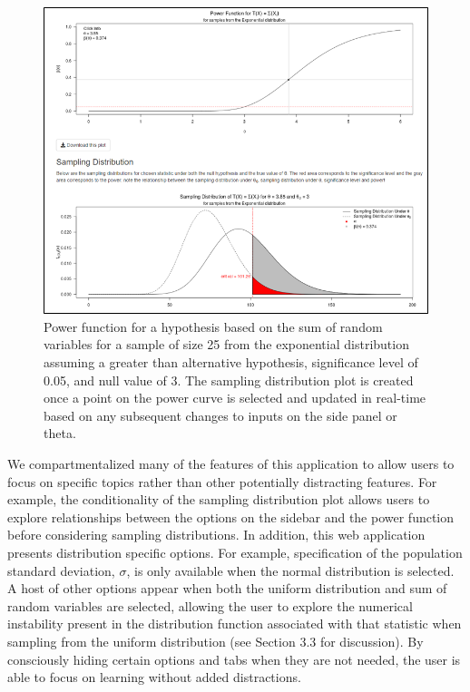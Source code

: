 \documentclass{TISE}
\begin{document}
\newpage

\begin{figure}[H]
	\centering
	\includegraphics[scale=1]{reactive.png}
	\caption{Power function for a hypothesis based on the sum of random variables for a sample of size 25 from the exponential distribution assuming a greater than alternative hypothesis, significance level of 0.05, and null value of 3. The sampling distribution plot is created once a point on the power curve is selected and updated in real-time based on any subsequent changes to inputs on the side panel or theta.}
\end{figure}

We compartmentalized many of the features of this application to allow users to focus on specific topics rather than other potentially distracting features. For example, the conditionality of the sampling distribution plot allows users to explore relationships between the options on the sidebar and the power function before considering sampling distributions. In addition, this web application presents distribution specific options. For example, specification of the population standard deviation, $\sigma$, is only available when the normal distribution is selected. A host of other options appear when both the uniform distribution and sum of random variables are selected, allowing the user to explore the numerical instability present in the distribution function associated with that statistic when sampling from the uniform distribution (see Section 3.3 for discussion). By consciously hiding certain options and tabs when they are not needed, the user is able to focus on learning without added distractions. 
\end{document}
